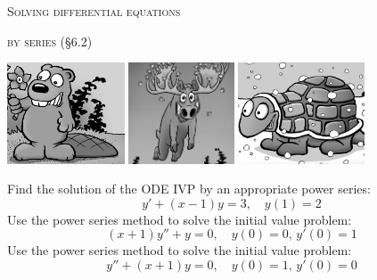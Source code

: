 \documentclass[12pt]{article}
\begin{document}
\renewcommand{\d}{\displaystyle}

\centerline{{\Large \textsc{Solving differential equations} \hspace{30mm}}}

\medskip
\centerline{{\Large \textsc{by series (\S6.2)} \hspace{33mm}}}

\vspace{-20mm}

\def\BEAVER{}

\ifdefined\BEAVER
\hfill \includegraphics[height=30mm]{figs/beaver.jpg}
\else
\ifdefined\MOOSE
\hfill \includegraphics[height=30mm]{figs/moose.jpg}
\else
\hfill \includegraphics[height=30mm]{figs/turtle.jpg}
\fi
\fi

\vspace{-10mm}
\noindent
{}

\medskip
\ifdefined\BEAVER
\noindent Find the solution of the ODE IVP by an appropriate power series:
    $$y' + (x-1) y = 3, \quad y(1) = 2$$
\else
\ifdefined\MOOSE
\noindent Use the power series method to solve the initial value problem:
    $$(x+1) y'' + y = 0, \quad y(0)=0, \, y'(0)=1$$
\else
\noindent Use the power series method to solve the initial value problem:
    $$y'' + (x+1)  y = 0, \quad y(0)=1, \, y'(0)=0$$
\fi
\fi
\vfill
\end{document}

